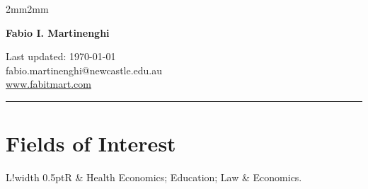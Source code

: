 \documentclass[11pt]{article}
\newcommand\VRule{\color{lightgray}\vrule width 0.5pt}
\begin{document}


\begin{adjustwidth}{2mm}{2mm}
    {\begin{center}
            {\bfseries\Huge Fabio I. Martinenghi}
        \end{center}}

    \vspace{6mm}

    \begin{flushright}
        \small
        Last updated: \today\\
        fabio.martinenghi@newcastle.edu.au\\
        \href{https://www.fabitmart.com/}{www.fabitmart.com}
    \end{flushright}

    \vspace{2mm}
    {
        \noindent
    }
    \vspace{2mm}
    \hrule
\end{adjustwidth}

\section*{Fields of Interest}
\begin{tabular}{L!{\VRule}R}
    {} & {Health Economics; Education; Law \& Economics.} \\[5pt]
\end{tabular}
\end{document}
